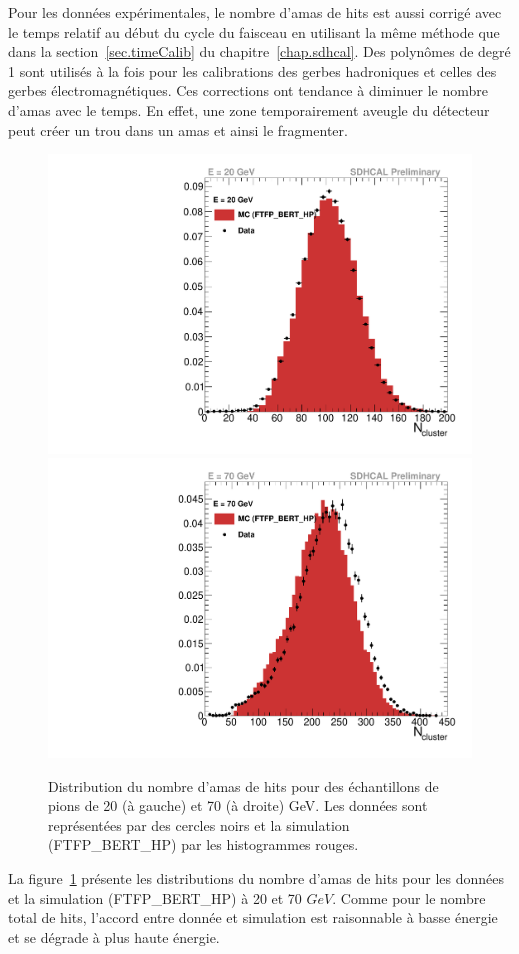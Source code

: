 Pour les données expérimentales, le nombre d'amas de hits est aussi corrigé avec le temps relatif au début du cycle du faisceau en utilisant la même méthode que dans la section~\ref{sec.timeCalib} du chapitre~\ref{chap.sdhcal}. Des polynômes de degré 1 sont utilisés à la fois pour les calibrations des gerbes hadroniques et celles des gerbes électromagnétiques. Ces corrections ont tendance à diminuer le nombre d'amas avec le temps. En effet, une zone temporairement aveugle du détecteur peut créer un trou dans un amas et ainsi le fragmenter.

\begin{figure}[!ht]
  \includegraphics[width=.5\textwidth]{Shower/figs/ncluster_pi-_20GeV_AugSep2012.pdf}
  \includegraphics[width=.5\textwidth]{Shower/figs/ncluster_pi-_70GeV_AugSep2012.pdf}
  \caption{Distribution du nombre d'amas de hits pour des échantillons de pions de 20 (à gauche) et 70 (à droite) GeV. Les données sont représentées par des cercles noirs et la simulation (FTFP\_BERT\_HP) par les histogrammes rouges. \label{fig.pi-cluster}}
\end{figure}
La figure~\ref{fig.pi-cluster} présente les distributions du nombre d'amas de hits pour les données et la simulation (FTFP\_BERT\_HP) à 20 et 70 $GeV$. Comme pour le nombre total de hits, l'accord entre donnée et simulation est raisonnable à basse énergie et se dégrade à plus haute énergie.

